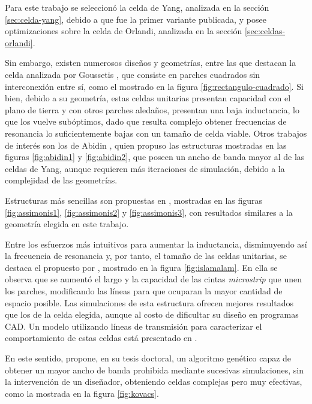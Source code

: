 Para este trabajo se seleccionó la celda de Yang, analizada en la sección \ref{sec:celda-yang}, debido a que fue la primer variante publicada, y posee optimizaciones sobre la celda de Orlandi, analizada en la sección \ref{sec:celdas-orlandi}.

Sin embargo, existen numerosos diseños y geometrías, entre las que destacan la celda analizada por Goussetis \cite{Goussetis:TailoringAMCEBGCharacteristics}, que consiste en parches cuadrados sin interconexión entre sí, como el mostrado en la figura \ref{fig:rectangulo-cuadrado}. Si bien, debido a su geometría, estas celdas unitarias presentan capacidad con el plano de tierra y con otros parches aledaños, presentan una baja inductancia, lo que los vuelve subóptimos, dado que resulta complejo obtener frecuencias de resonancia lo suficientemente bajas con un tamaño de celda viable. Otros trabajos de interés son los de Abidin \cite{Abidin:Thesis}, quien propuso las estructuras mostradas en las figuras \ref{fig:abidin1} y \ref{fig:abidin2}, que poseen un ancho de banda mayor al de las celdas de Yang, aunque requieren más iteraciones de simulación, debido a la complejidad de las geometrías.

Estructuras más sencillas son propuestas en \cite{Asimonis:designoptimization}, mostradas en las figuras \ref{fig:assimonis1}, \ref{fig:assimonis2} y \ref{fig:assimonis3}, con resultados similares a la geometría elegida en este trabajo.

Entre los esfuerzos más intuitivos para aumentar la inductancia, disminuyendo así la frecuencia de resonancia y, por tanto, el tamaño de las celdas unitarias, se destaca el propuesto por \cite{IslamAlam:CompactEBG}, mostrado en la figura \ref{fig:islamalam}. En ella se observa que se aumentó el largo y la capacidad de las cintas \textit{microstrip} que unen los parches, modificando las líneas para que ocuparan la mayor cantidad de espacio posible. Las simulaciones de esta estructura ofrecen mejores resultados que los de la celda elegida, aunque al costo de dificultar su diseño en programas \textsc{CAD}. Un modelo utilizando líneas de transmisión para caracterizar el comportamiento de estas celdas está presentado en \cite{Venkateswaran:Thesis}. 

En este sentido, \cite{Kovacs:DesignOptimization} propone, en su tesis doctoral, un algoritmo genético capaz de obtener un mayor ancho de banda prohibida mediante sucesivas simulaciones, sin la intervención de un diseñador, obteniendo celdas complejas pero muy efectivas, como la mostrada en la figura \ref{fig:kovacs}.


